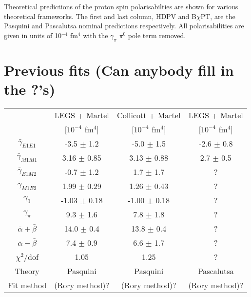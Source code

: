 \documentclass[]{article}
\begin{document}
\noindent Theoretical predictions of the proton spin polarisabilties are shown for various theoretical frameworks. The first and last column, HDPV and B$\chi$PT, are the Pasquini and Pascalutsa nominal predictions respectively. All polarisabilities are given in units of 10$^{-4}$ fm$^{4}$ with the $\gamma_{\pi}$ $\pi^{0}$ pole term removed.

\section{Previous fits (Can anybody fill in the ?'s)}

\begin{table}[h!]
	\centering %
	\begin{tabular}{|c|c|c|c|} %
		\hline %
		& LEGS + Martel & Collicott + Martel & LEGS + Martel\\
		& [$10^{-4}$ fm$^{4}$] & [$10^{-4}$ fm$^{4}$] & [$10^{-4}$ fm$^{4}$]\\
		\hline\hline
		$\bar{\gamma}_{E1E1}$ & -3.5 $\pm$ 1.2 				& -5.0 $\pm$ 1.5 \hspace{1mm} & -2.6 $\pm$ 0.8 \\
		$\bar{\gamma}_{M1M1}$ & \hspace{1mm}3.16 $\pm$ 0.85 	& 3.13 $\pm$ 0.88 & 2.7 $\pm$ 0.5 \\
		$\bar{\gamma}_{E1M2}$ & -0.7 $\pm$ 1.2 				& 1.7 $\pm$ 1.7 & ?\\
		$\bar{\gamma}_{M1E2}$ & \hspace{1mm}1.99 $\pm$ 0.29 	& 1.26 $\pm$ 0.43 & ?\\
		\hline
		$\gamma_{0}$ 	& -1.03 $\pm$ 0.18 				& -1.00 $\pm$ 0.18\hspace{1.5mm} & ?\\
		$\gamma_{\pi}$ 	& \hspace{1mm}9.3 $\pm$ 1.6 	& 7.8 $\pm$ 1.8 & ?\\%
		$\bar{\alpha} + \bar{\beta}$ & 14.0 $\pm$ 0.4 	& 13.8 $\pm$ 0.4\hspace{1mm} & ?\\
		$\bar{\alpha} - \bar{\beta}$ & \hspace{1mm}7.4 $\pm$ 0.9 	& 6.6 $\pm$ 1.7 & ?\\[0.5ex]
		\hline %
		$\chi^{2}$/dof & 1.05 & 1.25 & ?\\[0.5ex]
		\hline
		Theory & Pasquini & Pasquini & Pascalutsa\\[0.5ex]
		Fit method & (Rory method)? & (Rory method)? & (Rory method)? \\[0.5ex]
		\hline
	\end{tabular}
\end{table}
%
\end{document}
